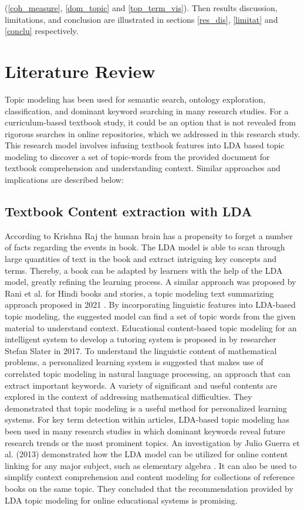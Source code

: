 \documentclass[sn-mathphys,Numbered]{sn-jnl}%
\theoremstyle{thmstyleone}%
\theoremstyle{thmstyletwo}%
\theoremstyle{thmstylethree}%
\begin{document}
(\ref{coh_measure}, \ref{dom_topic} and \ref{top_term_vis}). Then results discussion, limitations, and conclusion are illustrated in sections \ref{res_dis}, \ref{limitat} and \ref{conclu} respectively. 

\section{Literature Review}\label{lit_review} 
Topic modeling has been used for semantic search, ontology exploration, classification, and dominant keyword searching in many research studies. For a curriculum-based textbook study, it could be an option that is not revealed from rigorous searches in online repositories, which we addressed in this research study. This research model involves infusing textbook features into LDA based topic modeling to discover a set of topic-words from the provided document for textbook comprehension and understanding context. Similar approaches and implications are described below: 
\subsection{Textbook Content extraction with LDA}\label{Text_content_lda} 
According to Krishna Raj \cite{raj_p_m_sentiment_2022} the human brain has a propensity to forget a number of facts regarding the events in book. The LDA model is able to scan through large quantities of text in the book and extract intriguing key concepts and terms. Thereby, a book can be adapted by learners with the help of the LDA model, greatly refining the learning process. A similar approach was proposed by Rani et al. for Hindi books and stories, a topic modeling text summarizing approach proposed in 2021 \cite{rani_extractive_2021}. By incorporating linguistic features into LDA-based topic modeling, the suggested model can find a set of topic words from the given material to understand context. Educational content-based topic modeling for an intelligent system to develop a tutoring system is proposed in \cite{slater_using_2017} by researcher Stefan Slater in 2017. To understand the linguistic content of mathematical problems, a personalized learning system is suggested that makes use of correlated topic modeling in natural language processing, an approach that can extract important keywords. A variety of significant and useful contents are explored in the context of addressing mathematical difficulties. They demonstrated that topic modeling is a useful method for personalized learning systems. For key term detection within articles, LDA-based topic modeling has been used in many research studies in which dominant keywords reveal future research trends or the most prominent topics. An investigation by Julio Guerra et al. (2013) demonstrated how the LDA model can be utilized for online content linking for any major subject, such as elementary algebra \cite{guerra_when_2013}. It can also be used to simplify context comprehension and content modeling for collections of reference books on the same topic. They concluded that the recommendation provided by LDA topic modeling for online educational systems is promising.
\end{document}
